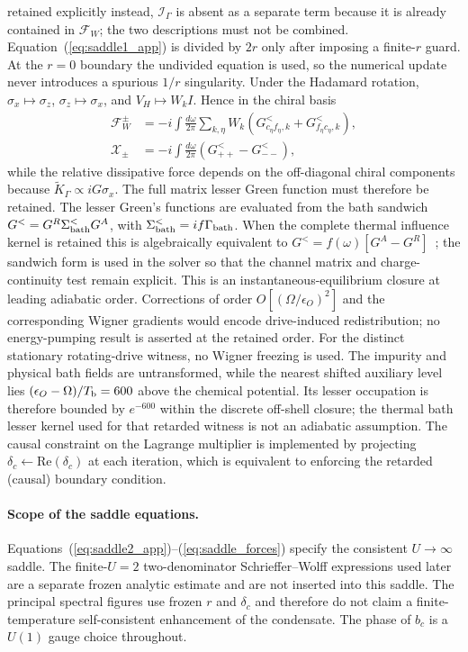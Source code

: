 \documentclass[%
  aps,prb,reprint,amsmath,amssymb,superscriptaddress,longbibliography,floatfix
]{revtex4-2}
\begin{document}
retained explicitly instead, $\mathcal I_\Gamma$ is absent as a separate term
because it is already contained in $\mathcal F_W$; the two descriptions must
not be combined.
Equation~(\ref{eq:saddle1_app}) is divided by $2r$ only after imposing a
finite-$r$ guard.  At the $r=0$ boundary the undivided equation is used, so
the numerical update never introduces a spurious $1/r$ singularity.
Under the Hadamard rotation,
$\sigma_x\mapsto\sigma_z$, $\sigma_z\mapsto\sigma_x$, and
$V_H\mapsto W_kI$.  Hence in the chiral basis
\begin{align}
\mathcal F_W^\pm
&=-i\int\frac{d\omega}{2\pi}\sum_{k,\eta}W_k
\left(G_{c_\eta f_\eta,k}^<+G_{f_\eta c_\eta,k}^<\right),\\
\mathcal X_\pm
&=-i\int\frac{d\omega}{2\pi}(G_{++}^<-G_{--}^<),
\end{align}
while the relative dissipative force depends on the off-diagonal chiral
components because $\widetilde K_\Gamma\propto iG\sigma_x$.
The full matrix lesser Green function must therefore be retained.
The lesser Green's functions are evaluated from the bath sandwich
$G^<=G^R\Sigma_{\rm bath}^<G^A$, with
$\Sigma_{\rm bath}^<=if\Gamma_{\rm bath}$.  When the complete thermal
influence kernel is retained this is algebraically equivalent to
$G^<=f(\omega)[G^A-G^R]$~\cite{kamenev2023field}; the sandwich form is used
in the solver so that the channel matrix and charge-continuity test remain
explicit.  This is an instantaneous-equilibrium closure at leading
adiabatic order.  Corrections of order $O[(\Omega/\epsilon_O)^2]$ and the
corresponding Wigner gradients would encode drive-induced redistribution;
no energy-pumping result is asserted at the retained order.
For the distinct stationary rotating-drive witness, no Wigner freezing is
used.  The impurity and physical bath fields are untransformed, while the
nearest shifted auxiliary level lies $(\epsilon_O-\Omega)/T_{\rm b}=600$
above the chemical potential.  Its lesser occupation is therefore bounded by
$e^{-600}$ within the discrete off-shell closure; the thermal bath lesser
kernel used for that retarded witness is not an adiabatic assumption.
The causal constraint on the Lagrange multiplier is implemented
by projecting $\delta_c\leftarrow\mathrm{Re}(\delta_c)$ at each
iteration, which is equivalent to enforcing the retarded
(causal) boundary condition.

\paragraph{Scope of the saddle equations.}
Equations~(\ref{eq:saddle2_app})--(\ref{eq:saddle_forces}) specify the
consistent $U\to\infty$ saddle.  The finite-$U=2$ two-denominator
Schrieffer--Wolff expressions used later are a separate frozen analytic
estimate and are not inserted into this saddle.  The principal spectral
figures use frozen $r$ and $\delta_c$ and therefore do not claim a
finite-temperature self-consistent enhancement of the condensate.  The phase
of $b_c$ is a $U(1)$ gauge choice throughout.
\end{document}
